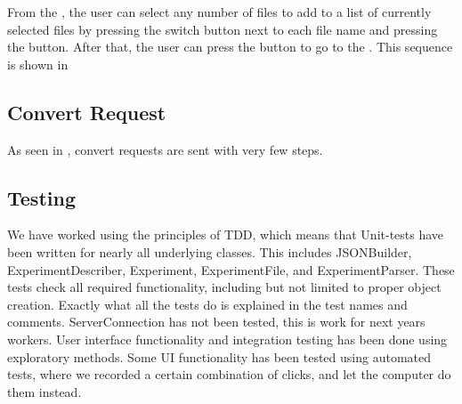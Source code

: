 From the , the user can select any number of files to add to a list of currently selected files by pressing the switch button next to each file name and pressing the  button. After that, the user can press the  button to go to the . This sequence is shown in 


\subsection{Convert Request}

As seen in , convert requests are sent with very few steps. 


\subsection{Testing}

We have worked using the principles of TDD, which means that Unit-tests have been written for nearly all underlying classes. This includes JSONBuilder, ExperimentDescriber, Experiment, ExperimentFile, and ExperimentParser. These tests check all required functionality, including but not limited to proper object creation. Exactly what all the tests do is explained in the test names and comments. ServerConnection has not been tested, this is work for next years workers. User interface functionality and integration testing has been done using exploratory methods. Some UI functionality has been tested using automated tests, where we recorded a certain combination of clicks, and let the computer do them instead. 
